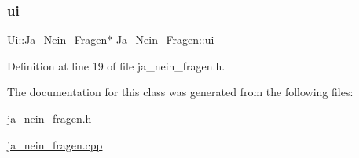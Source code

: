 \subsubsection{\texorpdfstring{ui}{ui}}
{\footnotesize\ttfamily Ui\+::\+Ja\+\_\+\+Nein\+\_\+\+Fragen$\ast$ Ja\+\_\+\+Nein\+\_\+\+Fragen\+::ui\hspace{0.3cm}{\ttfamily [private]}}



Definition at line 19 of file ja\+\_\+nein\+\_\+fragen.\+h.



The documentation for this class was generated from the following files\+:\begin{DoxyCompactItemize}
\item 
\mbox{\hyperlink{ja__nein__fragen_8h}{ja\+\_\+nein\+\_\+fragen.\+h}}\item 
\mbox{\hyperlink{ja__nein__fragen_8cpp}{ja\+\_\+nein\+\_\+fragen.\+cpp}}\end{DoxyCompactItemize}
